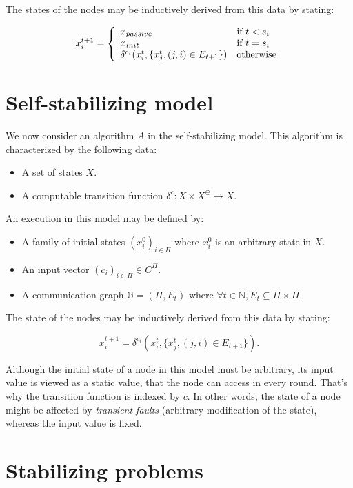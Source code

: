 \documentclass[11pt,letterpaper]{article}
\begin{document}
\noindent The states of the nodes may be inductively derived from this data by stating:

$$x_i^{t+1} = \left \{ \begin{array}{l l} x_{passive} & \mbox{if}~t < s_i \\
	x_{init} & \mbox{if}~t = s_i \\
\delta^{c_i}(x_i^t, \{x_j^t, (j,i) \in E_{t+1}\}) & \mbox{otherwise} \end{array} \right.$$

\section{Self-stabilizing model}

We now consider an algorithm $A$ in the self-stabilizing model.
This algorithm is characterized by the following data:

\begin{itemize}
	\item A set of states $X$.
	\item A computable transition function $\delta^c : X \times X^\oplus \rightarrow X$.
\end{itemize}

\noindent An execution in this model may be defined by:
\begin{itemize}
	\item A family of initial states $(x_i^0)_{i \in \Pi}$ where $x_i^0$ is an arbitrary state in $X$.
	\item An input vector $(c_i)_{i \in \Pi} \in C^\Pi$.
	\item A communication graph $\mathds{G} = (\Pi, E_t)$ where $\forall t \in \mathds{N}, E_t \subseteq \Pi \times \Pi$.
\end{itemize}

The state of the nodes may be inductively derived from this data by stating:

$$x_i^{t+1} = \delta^{c_i}(x_i^t, \{x_j^t, (j,i) \in E_{t+1}\}).$$

Although the initial state of a node in this model must be arbitrary, its input value is viewed as a static value,
that the node can access in every round. That's why the transition function is indexed by $c$.
In other words, the state of a node might be affected by \textit{transient faults} (arbitrary modification of the state),
whereas the input value is fixed.

\section{Stabilizing problems}
\end{document}
